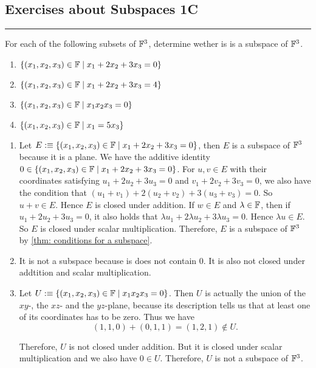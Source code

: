 \subsection*{Exercises about Subspaces 1C}
\hrule
\phantom{.}

\begin{xrcs}
  For each of the following subsets of $\mathbb{F}^3$, determine wether is is a subspace of $\mathbb{F}^3$.
  \begin{enumerate}
    \item $\{(x_1, x_2, x_3) \in \mathbb{F} \mid x_1 + 2x_2 + 3 x_3 = 0\}$
    \item $\{(x_1, x_2, x_3) \in \mathbb{F} \mid x_1 + 2x_2 + 3 x_3 = 4\}$
    \item $\{(x_1, x_2, x_3) \in \mathbb{F} \mid x_1 x_2 x_3 = 0\}$
    \item $\{(x_1, x_2, x_3) \in \mathbb{F} \mid x_1 = 5x_3\}$
  \end{enumerate}

  \begin{xsol}
    \begin{enumerate}
    \item Let $E :\equiv \{(x_1, x_2, x_3) \in \mathbb{F} \mid x_1 + 2x_2 + 3 x_3 = 0\}$, then $E$ is a subspace of $\mathbb{F}^3$ because it is a plane. We have the additive identity  $0 \in \{(x_1, x_2, x_3) \in \mathbb{F} \mid x_1 + 2x_2 + 3 x_3 = 0\}$. For $u,v \in E$ with their coordinates satisfying $u_1 + 2u_2 + 3u_3 = 0$ and $v_1 + 2v_2 + 3v_3 = 0$, we also have the condition that $(u_1 + v_1) + 2 (u_2 + v_2) + 3(u_3 + v_3)= 0$. So $u+v \in E$. Hence $E$ is closed under addition. If $w \in E$ and $\lambda \in \mathbb{F}$, then if $u_1 + 2u_2 + 3u_3 = 0$, it also holds that $\lambda u_1 + 2\lambda u_2 + 3\lambda u_3 = 0$. Hence $\lambda u \in E$. So $E$ is closed under scalar multiplication. Therefore, $E$ is a subspace of $\mathbb{F}^3$ by \ref{thm: conditions for a subspace}.

    \item It is not a subspace because is does not contain $0$. It is also not closed under addtition and scalar multiplication.

    \item Let $U :\equiv \{(x_1, x_2, x_3) \in \mathbb{F} \mid x_1 x_2 x_3 = 0\}$. Then $U$ is actually the union of the $xy$-, the $xz$- and the $yz$-plane, because its description tells us that at least one of its coordinates has to be zero. Thus we have
    \[
    (1,1,0) + (0,1,1) = (1,2,1) \notin U.
    \]

    Therefore, $U$ is not closed under addition. But it is closed under scalar multiplication and we also have $0 \in U$. Therefore, $U$ is not a subspace of $\mathbb{F}^3$.


\end{enumerate}
\end{xsol}
\end{xrcs}
